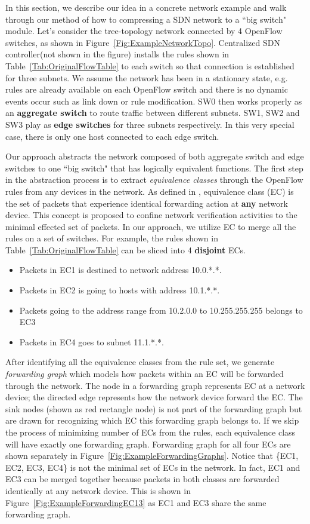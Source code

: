 In this section, we describe our idea in a concrete network example and
walk through our method of how to compressing a SDN network to a ``big switch" module.
Let's consider the tree-topology network connected by 4 OpenFlow switches,
as shown in Figure~\ref{Fig:ExampleNetworkTopo}.
Centralized SDN controller(not shown in the figure) installs the rules shown in
Table~\ref{Tab:OriginalFlowTable} to each switch so that connection is established
for three subnets.
We assume the network has been in a stationary state, e.g. rules are already available
on each OpenFlow switch and there is no dynamic events occur such as link down
or rule modification.
SW0 then works properly as an \textbf{aggregate switch} to route traffic
between different subnets.
SW1, SW2 and SW3 play as \textbf{edge switches} for three subnets respectively.
In this very special case, there is only one host connected to each edge switch.

Our approach abstracts the network composed of both aggregate switch and edge switches
to one ``big switch" that has logically equivalent functions.
The first step in the abstraction process is to extract \textit{equivalence classes}
through the OpenFlow rules from any devices in the network.
As defined in \cite{Veriflow}, equivalence class (EC) is the set of packets that
experience identical forwarding action at \textbf{any} network device.
This concept is proposed to confine network verification activities to the minimal
effected set of packets\cite{Veriflow}.
In our approach, we utilize EC to merge all the rules on a set of switches.
For example, the rules shown in Table~\ref{Tab:OriginalFlowTable} can be sliced into
4 \textbf{disjoint} ECs.
\begin{itemize}
\item Packets in EC1 is destined to network address 10.0.*.*.
\item Packets in EC2 is going to hosts with address 10.1.*.*.
\item Packets going to the address range from 10.2.0.0 to 10.255.255.255 belongs to EC3
\item Packets in EC4 goes to subnet 11.1.*.*. 
\end{itemize}

After identifying all the equivalence classes from the rule set,
we generate \textit{forwarding graph} which models how packets within an EC will be
forwarded through the network\cite{Veriflow}.
The node in a forwarding graph represents EC at a network device;
the directed edge represents how the network device forward the EC.
The sink nodes (shown as red rectangle node) is not part of the forwarding graph
but are drawn for recognizing which EC this forwarding graph belongs to.
If we skip the process of minimizing number of ECs from the rules,
each equivalence class will have exactly one forwarding graph.
Forwarding graph for all four ECs are shown separately in
Figure~\ref{Fig:ExampleForwardingGraphs}.
Notice that \{EC1, EC2, EC3, EC4\} is not the minimal set of ECs in the network.
In fact, EC1 and EC3 can be merged together because packets in both classes are forwarded
identically at any network device.
This is shown in Figure~\ref{Fig:ExampleForwardingEC13} as EC1 and EC3 share the same
forwarding graph.

